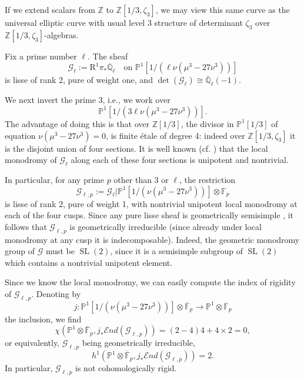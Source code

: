 If we extend scalars from \(\mathbb{Z}\) to \(\mathbb{Z}[1/3,\zeta_3]\), we may view this same curve as the universal elliptic curve with usual level 3 structure of determinant \(\zeta_3\) over \(\mathbb{Z}[1/3,\zeta_3]\)-algebras.

Fix a prime number \(\ell\). The sheaf
\[
\mathcal{G}_\ell:=\mathrm{R}^1\pi_*\overline{\mathbb{Q}}_\ell\quad\text{on }\mathbb{P}^1[1/(\ell\nu(\mu^3-27\nu^3))]
\]
is lisse of rank 2, pure of weight one, and \(\det(\mathcal{G}_\ell)\cong\overline{\mathbb{Q}}_\ell(-1)\).

We next invert the prime 3, i.e., we work over
\[
\mathbb{P}^1[1/(3\ell\nu(\mu^3-27\nu^3))].
\]
The advantage of doing this is that over \(\mathbb{Z}[1/3]\), the divisor in \(\mathbb{P}^1[1/3]\) of equation \(\nu(\mu^3-27\nu^3)=0\), is finite étale of degree 4: indeed over \(\mathbb{Z}[1/3,\zeta_3]\) it is the disjoint union of four sections. It is well known (cf. \cite[14.3.3]{KM}) that the local monodromy of \(\mathcal{G}_\ell\) along each of these four sections is unipotent and nontrivial.

In particular, for any prime \(p\) other than 3 or \(\ell\), the restriction
\[
\mathcal{G}_{\ell,p}:=\mathcal{G}_\ell\vert \mathbb{P}^1[1/(\nu(\mu^3-27\nu^3))]\otimes\mathbb{F}_p
\]
is lisse of rank 2, pure of weight 1, with nontrivial unipotent local monodromy at each of the four cusps. Since any pure lisse sheaf is geometrically semisimple \cite[3.4(iii)]{De-WeilII}, it follows that \(\mathcal{G}_{\ell,p}\) is geometrically irreducible (since already under local monodromy at any cusp it is indecomposable). Indeed, the geometric monodromy group of \(\mathcal{G}\) must be \(\operatorname{SL}(2)\), since it is a semisimple subgroup of \(\operatorname{SL}(2)\) which contains a nontrivial unipotent element.

Since we know the local monodromy, we can easily compute the index of rigidity of \(\mathcal{G}_{\ell,p}\). Denoting by
\[
j:\mathbb{P}^1[1/(\nu(\mu^3-27\nu^3))]\otimes\overline{\mathbb{F}}_p\to\mathbb{P}^1\otimes\overline{\mathbb{F}}_p
\]
the inclusion, we find
\[
\chi(\mathbb{P}^1\otimes\overline{\mathbb{F}}_p,j_*\mathcal{E}nd(\mathcal{G}_{\ell,p}))=(2-4)4+4\times2=0,
\]
or equivalently, \(\mathcal{G}_{\ell,p}\) being geometrically irreducible,
\[
h^1(\mathbb{P}^1\otimes\overline{\mathbb{F}}_p,j_*\mathcal{E}nd(\mathcal{G}_{\ell,p}))=2.
\]
In particular, \(\mathcal{G}_{\ell,p}\) is not cohomologically rigid.

